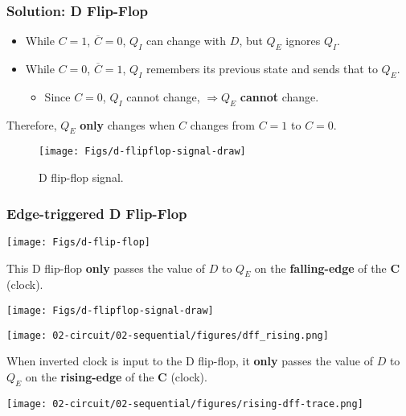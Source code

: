 \ifnum{}
\begin{frame}\frametitle{Solution: D Flip-Flop}
\begin{itemize}
\item While $C=1$, $\overline{C}=0$, $Q_I$ can change with $D$, but $Q_E$ ignores $Q_I$.

\item While $C=0$, $\overline{C}=1$, $Q_I$ remembers its previous state and sends that to $Q_E$. \begin{itemize}
\item Since $C=0$, $Q_I$ cannot change, $ \Rightarrow Q_E$ \textbf{cannot} change.
\end{itemize}
\end{itemize}
Therefore, $Q_E$ \textbf{only} changes when $C$ changes from $C=1$ to $C=0$.

\begin{figure}[H]
\centering
	{\texttt{[image: Figs/d-flipflop-signal-draw]}}
\caption{D flip-flop signal.}
\end{figure}
\end{frame}
\fi
\begin{frame}\frametitle{Edge-triggered D Flip-Flop}
\begin{tcolorbox}[enhanced,attach boxed title to top center={yshift=-3mm,yshifttext=-1mm},
  colback=blue!5!white,colframe=blue!75!black,colbacktitle=blue!80!black,
  title=Think About It,fonttitle=\bfseries,
  boxed title style={size=small,colframe=red!50!black} ]
\begin{multicols}{2}
\begin{center}
    \texttt{[image: Figs/d-flip-flop]}
 \end{center}   
\small This D flip-flop \textbf{only} passes the value of $D$ to $Q_E$ on the \textbf{falling-edge} of the \textbf{C} (clock).
\begin{center}
    {\texttt{[image: Figs/d-flipflop-signal-draw]}}
\end{center}

\columnbreak

\begin{center}    
      \texttt{[image: 02-circuit/02-sequential/figures/dff\_rising.png]}
      \end{center}
\small When inverted clock is input to the D flip-flop, it \textbf{only} passes the value of $D$ to $Q_E$ on the \textbf{rising-edge} of the \textbf{C} (clock).
\begin{center}
    {\texttt{[image: 02-circuit/02-sequential/figures/rising-dff-trace.png]}}
\end{center}
\end{multicols}
\end{tcolorbox}
\end{frame}

